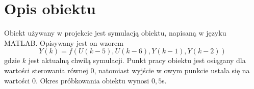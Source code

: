 \chapter{Opis obiektu}
\label{sec:opis}
Obiekt używany w projekcie jest symulacją obiektu, napisaną w języku MATLAB.
Opisywany jest on wzorem
\begin{equation}
  Y(k) = f(U(k - 5), U(k - 6), Y(k - 1), Y(k - 2))
\end{equation}
gdzie $k$ jest aktualną chwilą symulacji.
Punkt pracy obiektu jest osiągany dla wartości sterowania równej $0$,
natomiast wyjście w owym punkcie ustala się na wartości $0$. Okres próbkowania
obiektu wynosi $0,5$s.